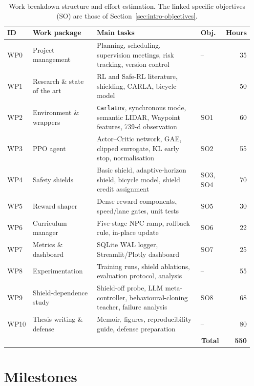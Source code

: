 \begin{table}[H]
  \centering
  \caption{Work breakdown structure and effort estimation. The linked specific objectives (SO)
           are those of Section~\ref{sec:intro-objectives}.}
  \label{tab:wbs}
  \small
  \begin{tabular}{@{}llp{6.0cm}lr@{}}
    \toprule
    \textbf{ID} & \textbf{Work package} & \textbf{Main tasks} & \textbf{Obj.} & \textbf{Hours} \\
    \midrule
    WP0  & Project management        & Planning, scheduling, supervision meetings, risk tracking, version control & -- & 35 \\
    WP1  & Research \& state of the art & RL and Safe-RL literature, shielding, CARLA, bicycle model & -- & 50 \\
    WP2  & Environment \& wrappers   & \texttt{CarlaEnv}, synchronous mode, semantic LIDAR, Waypoint features, 739-d observation & SO1 & 60 \\
    WP3  & PPO agent                 & Actor--Critic network, GAE, clipped surrogate, KL early stop, normalisation & SO2 & 55 \\
    WP4  & Safety shields            & Basic shield, adaptive-horizon shield, bicycle model, shield credit assignment & SO3, SO4 & 70 \\
    WP5  & Reward shaper             & Dense reward components, speed/lane gates, unit tests & SO5 & 30 \\
    WP6  & Curriculum manager        & Five-stage NPC ramp, rollback rule, in-place update & SO6 & 22 \\
    WP7  & Metrics \& dashboard      & SQLite WAL logger, Streamlit/Plotly dashboard & SO7 & 25 \\
    WP8  & Experimentation           & Training runs, shield ablations, evaluation protocol, analysis & -- & 55 \\
    WP9  & Shield-dependence study   & Shield-off probe, LLM meta-controller, behavioural-cloning teacher, failure analysis & SO8 & 68 \\
    WP10 & Thesis writing \& defense & Memoir, figures, reproducibility guide, defense preparation & -- & 80 \\
    \midrule
    \multicolumn{4}{r}{\textbf{Total}} & \textbf{550} \\
    \bottomrule
  \end{tabular}
\end{table}

\section{Milestones}\label{sec:plan-milestones}

